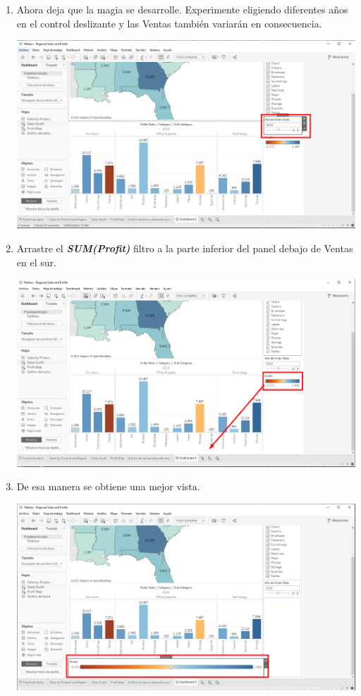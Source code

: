 \documentclass[12pt,letterpaper]{article}
\begin{document}
\begin{enumerate}
\begin{center}
        \end{center}
        \item Ahora deja que la magia se desarrolle. Experimente eligiendo diferentes años en el control deslizante y las Ventas también variarán en consecuencia.
        \begin{center}
            \includegraphics[width=15cm]{./img/img78.png}
        \end{center}
        \item Arrastre el \textit{\textbf{SUM(Profit)}} filtro a la parte inferior del panel debajo de Ventas en el sur.
        \begin{center}
            \includegraphics[width=15cm]{./img/img79.png}
        \end{center}
        \item De esa manera se obtiene una mejor vista.
        \begin{center}
            \includegraphics[width=15cm]{./img/img80.png}
        \end{center}
    \end{enumerate}
\end{document}
